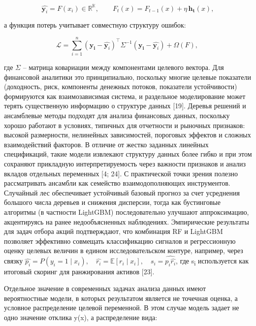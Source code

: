 \documentclass[
]{article}
\begin{document}
\[\widehat{\mathbf{y}_{i}} = F\left( x_{i} \right) \in \mathbb{R}^{\mathbb{K}},\quad\quad F_{t}(x) = F_{t - 1}(x) + \eta\,\mathbf{h}_{\mathbf{t}}(x),\]

а функция потерь учитывает совместную структуру ошибок:

\[\mathcal{L} = \sum_{i = 1}^{n}{\left( \mathbf{y}_{\mathbf{i}} - \widehat{\mathbf{y}_{i}} \right)^{\top}\Sigma^{- 1}\left( \mathbf{y}_{\mathbf{i}} - \widehat{\mathbf{y}_{i}} \right)} + \Omega(F),\ \]

где \(\Sigma\) -- матрица ковариации между компонентами целевого вектора. Для финансовой аналитики это принципиально, поскольку многие целевые показатели (доходность, риск, компоненты денежных потоков, показатели устойчивости) формируются как взаимозависимая система, и раздельное моделирование может терять существенную информацию о структуре данных {[}19{]}. Деревья решений и ансамблевые методы подходят для анализа финансовых данных, поскольку хорошо работают в условиях, типичных для отчетности и рыночных признаков: высокой размерности, нелинейных зависимостей, пороговых эффектов и сложных взаимодействий факторов. В отличие от жестко заданных линейных спецификаций, такие модели извлекают структуру данных более гибко и при этом сохраняют прикладную интерпретируемость через важности признаков и анализ вкладов отдельных переменных {[}4; 24{]}. С практической точки зрения полезно рассматривать ансамбли как семейство взаимодополняющих инструментов. Случайный лес обеспечивает устойчивый базовый прогноз за счет усреднения большого числа деревьев и снижения дисперсии, тогда как бустинговые алгоритмы (в частности LightGBM) последовательно улучшают аппроксимацию, акцентируясь на ранее недообъясненных наблюдениях. Эмпирические результаты для задач отбора акций подтверждают, что комбинация RF и LightGBM позволяет эффективно совмещать классификацию сигналов и регрессионную оценку целевых величин в едином исследовательском контуре, например, через связку \(\widehat{p_{i}} = P\left( y_{i} = 1\mid x_{i} \right),\quad\widehat{r_{i}} = \mathbb{E}\left\lbrack r_{i}\mid x_{i} \right\rbrack,\quad s_{i} = \widehat{p_{i}\widehat{r_{i}}}\), где s\textsubscript{i} используется как итоговый скоринг для ранжирования активов {[}23{]}.

Отдельное значение в современных задачах анализа данных имеют вероятностные модели, в которых результатом является не точечная оценка, а условное распределение целевой переменной. В этом случае модель задает не одно значение отклика y(x), а распределение вида:
\end{document}
